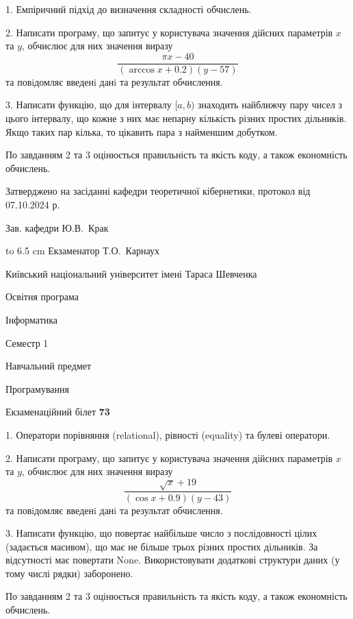 \documentclass[12pt, ukrainian]{article}
\begin{document}
{%
1. Емпіричний підхід до визначення складності обчислень.%
\par
2. Написати програму, що запитує у користувача значення дійсних параметрів $x$ та $y$, обчислює для них значення виразу 
$$\frac{\pi x - 40}{(\arccos x + 0.2) (y - 57)}$$ 
та повiдомляє введенi данi та результат обчислення.

\par
3. Написати функцію, що для інтервалу $[a, b)$ знаходить найближчу пару чисел з цього інтервалу, що кожне з них має непарну кількість різних простих дільників. Якщо таких пар кілька, то цікавить пара з найменшим добутком.

По завданням 2 та 3 оцінюється правильність та якість коду, а також економність обчислень.

}
{\smallskip\smallskip \begin {scriptsize} Затверджено на засіданні кафедри теоретичної кібернетики, протокол   від   07.10.2024 р.\par\smallskip\smallskip\smallskip\smallskip
{\parbox {6.5 cm} {Зав. кафедри \dotfill Ю.В.~Крак}}\hspace {0.7cm} {\hbox to 6.5 cm { Екзаменатор \dotfill Т.О.~Карнаух}} \end{scriptsize}}
\newpage
{{\begin {scriptsize}\par
{ \center  Київський національний університет імені Тараса Шевченка \par}
{\parbox {5 cm}{Освітня програма \hfill}{\parbox {7 cm}{Інформатика\hfill}}\parbox {6 cm}{\hfill Семестр 1}}\par
{\parbox {5 cm} {Навчальний предмет \hfill}\parbox {7 cm}{Програмування \hfill}\parbox {6cm}{\hfill}\par}\vspace{-15pt} \end{scriptsize}}{\center Екзаменаційний білет \No \textbf { 73 }\par}}
{%
1. Оператори порівняння (relational), рівності (equality) та булеві оператори.%
\par
2. Написати програму, що запитує у користувача значення дійсних параметрів $x$ та $y$, обчислює для них значення виразу 
$$\frac{\sqrt x + 19}{(\cos x + 0.9) (y - 43)}$$ 
та повiдомляє введенi данi та результат обчислення.

\par
3. Написати функцію, що повертає найбільше число з послідовності цілих (задається масивом), що має не більше трьох різних простих дільників. За відсутності має повертати None. Використовувати додаткові структури даних (у тому числі рядки) заборонено.

По завданням 2 та 3 оцінюється правильність та якість коду, а також економність обчислень.

}
\end{document}
